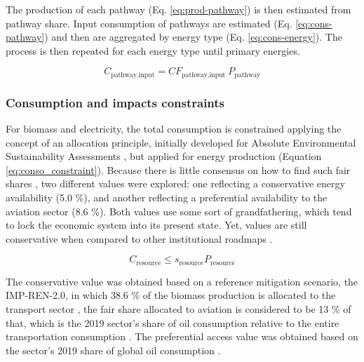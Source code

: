 \documentclass[
]{kaohandt}
\begin{document}
The production of each pathway (Eq. \ref{eq:prod-pathway}) is then estimated from pathway share. Input consumption of pathways are estimated (Eq. \ref{eq:cons-pathway}) and then are aggregated by energy type (Eq. \ref{eq:cons-energy}). The process is then repeated for each energy type until primary energies.

\begin{equation}
    C_{\text{pathway}, \text{input}}=CF_{\text{pathway}, \text{input}}\ P_{\text{pathway}}
    \label{eq:cons-pathway}
\end{equation}


\subsubsection{Consumption and impacts constraints}

For biomass and electricity, the total consumption is constrained applying the concept of an allocation principle, initially developed for Absolute Environmental Sustainability Assessments , but applied for energy production (Equation \ref{eq:conso_constraint}). Because there is little consensus on how to find such fair shares , two different values were explored: one reflecting a conservative energy availability (5.0 \%), and another reflecting a preferential availability to the aviation sector (8.6 \%). Both values use some sort of grandfathering, which tend to lock the economic system into its present state. Yet, values are still conservative when compared to other institutional roadmaps .

\begin{equation}
    \label{eq:conso_constraint}
    C_{\text{resource}} \le s_{\text{resource}} P_{\text{resource}}
\end{equation}

The conservative value was obtained based on a reference mitigation scenario, the IMP-REN-2.0, in which 38.6 \% of the biomass production is allocated to the transport sector , the fair share allocated to aviation is considered to be 13 \% of that, which is the 2019 sector's share of oil consumption relative to the entire transportation consumption . The preferential access value was obtained based on the sector's 2019 share of global oil consumption \cite{IEA2019oil}.
\end{document}
